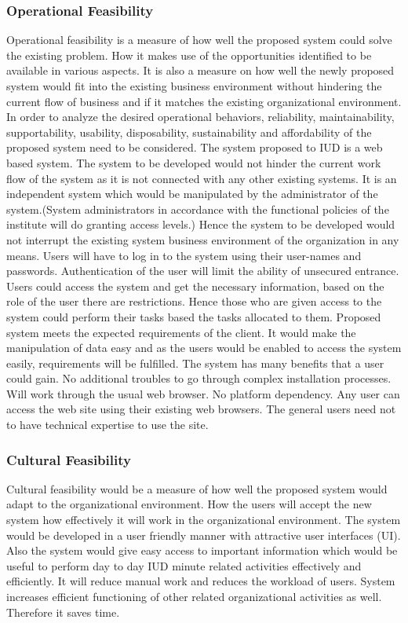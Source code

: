 \documentclass[a4paper,beamer]{article}
\begin{document}
	\subsubsection{Operational Feasibility}
	Operational feasibility is a measure of how well the proposed system could solve the existing problem. How it makes use of the opportunities identified to be available in various aspects.
	It is also a measure on how well the newly proposed system would fit into the existing business environment without hindering the current flow of business and if it matches the existing organizational environment.
	In order to analyze the desired operational behaviors, reliability, maintainability, supportability, usability, disposability, sustainability and affordability of the proposed system need to be considered.
	The system proposed to IUD is a web based system. The system to be developed would not hinder the current work flow of the system as it is not connected with any other existing systems. It is an independent system which would be manipulated by the administrator of the system.(System administrators in accordance with the functional policies of the institute will do granting access levels.) Hence the system to be developed would not interrupt the existing system business environment of the organization in any means.
	Users will have to log in to the system using their user-names and passwords. Authentication of the user will limit the ability of unsecured entrance.
	Users could access the system and get the necessary information, based on the role of the user there are restrictions. Hence those who are given access to the system could perform their tasks based the tasks allocated to them.
	Proposed system meets the expected requirements of the client. It would make the manipulation of data easy and as the users would be enabled to access the system easily, requirements will be fulfilled.
	The system has many benefits that a user could gain.
	No additional troubles to go through complex installation processes. Will work through the usual web browser.
	No platform dependency. Any user can access the web site using their existing web browsers. The general users need not to have technical expertise to use the site.
	
	\subsubsection{Cultural Feasibility}
	Cultural feasibility would be a measure of how well the proposed system would adapt to the organizational environment. How the users will accept the new system how effectively it will work in the organizational environment.
	The system would be developed in a user friendly manner with attractive user interfaces (UI). Also the system would give easy access to important information which would be useful to perform day to day IUD minute related activities effectively and efficiently.
	It will reduce manual work and reduces the workload of users.
	System increases efficient functioning of other related organizational activities as well. Therefore it saves time.
	
\end{document}
